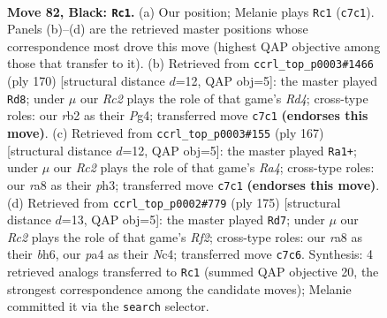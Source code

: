 \documentclass[11pt]{article}
\begin{document}
\clearpage

\begin{figure}[p]\centering
\begin{subfigure}{0.46\textwidth}\centering
\resizebox{\linewidth}{!}{%
\newchessgame
\chessboard[
  setfen={R7/2r2p2/4p2k/8/P3P3/5PK1/1R6/8 b - - 56 82},
  showmover=false,
  pgfstyle=straightmove, color=movearrow, markmove={c7-c1}
]}
\caption{}
\end{subfigure}\hfill
\begin{subfigure}{0.46\textwidth}\centering
\resizebox{\linewidth}{!}{%
\newchessgame
\chessboard[
  setfen={8/5pk1/4p3/4P3/3R1PP1/8/6K1/2r5 w - - 87 86},
  showmover=false,
  pgfstyle=straightmove, color=movearrow, markmove={d4-d8}
]}
\caption{}
\end{subfigure}
\\[4pt]
\begin{subfigure}{0.46\textwidth}\centering
\resizebox{\linewidth}{!}{%
\newchessgame
\chessboard[
  setfen={8/8/6k1/r5p1/5p2/5P1P/1R4P1/6K1 b - - 81 84},
  showmover=false,
  pgfstyle=straightmove, color=movearrow, markmove={a5-a1}
]}
\caption{}
\end{subfigure}\hfill
\begin{subfigure}{0.46\textwidth}\centering
\resizebox{\linewidth}{!}{%
\newchessgame
\chessboard[
  setfen={8/5r1p/6pB/8/2n5/7P/R5P1/3k2K1 b - - 49 88},
  showmover=false,
  pgfstyle=straightmove, color=movearrow, markmove={f7-d7}
]}
\caption{}
\end{subfigure}
\caption{\textbf{Move 82, Black: \texttt{Rc1}.} (a) Our position; Melanie plays \texttt{Rc1} (\texttt{c7c1}). Panels (b)--(d) are the retrieved master positions whose correspondence most drove this move (highest QAP objective among those that transfer to it). (b) Retrieved from \texttt{ccrl\_top\_p0003\#1466} (ply 170) [structural distance $d$=12, QAP obj=5]: the master played \texttt{Rd8}; under $\mu$ our \emph{Rc2} plays the role of that game's \emph{Rd4}; cross-type roles: our \emph{r}b2 as their \emph{P}g4; transferred move \texttt{c7c1} \textbf{(endorses this move)}. (c) Retrieved from \texttt{ccrl\_top\_p0003\#155} (ply 167) [structural distance $d$=12, QAP obj=5]: the master played \texttt{Ra1+}; under $\mu$ our \emph{Rc2} plays the role of that game's \emph{Ra4}; cross-type roles: our \emph{r}a8 as their \emph{p}h3; transferred move \texttt{c7c1} \textbf{(endorses this move)}. (d) Retrieved from \texttt{ccrl\_top\_p0002\#779} (ply 175) [structural distance $d$=13, QAP obj=5]: the master played \texttt{Rd7}; under $\mu$ our \emph{Rc2} plays the role of that game's \emph{Rf2}; cross-type roles: our \emph{r}a8 as their \emph{b}h6, our \emph{p}a4 as their \emph{N}c4; transferred move \texttt{c7c6}. Synthesis: 4 retrieved analogs transferred to \texttt{Rc1} (summed QAP objective 20, the strongest correspondence among the candidate moves); Melanie committed it via the \texttt{search} selector.}
\label{fig:thought-m163}
\end{figure}
\end{document}
